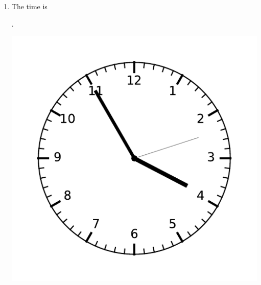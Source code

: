 \documentclass{tufte-book}
\begin{document}
\begin{enumerate}
  \item The time is \dotfill\bigskip\par\dotfill\bigskip.
  \begin{marginfigure}\includegraphics[width=\textwidth]{maths/fig/clock_0355.pdf}\end{marginfigure}


\end{enumerate}
\end{document}
